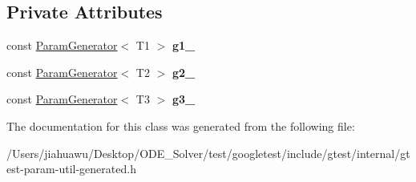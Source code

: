 \subsection*{Private Attributes}
\begin{DoxyCompactItemize}
\item 
\mbox{\label{classtesting_1_1internal_1_1_cartesian_product_generator3_a2c42604631f735285a8ed339e0b1373e}} 
const \mbox{\hyperlink{classtesting_1_1internal_1_1_param_generator}{Param\+Generator}}$<$ T1 $>$ {\bfseries g1\+\_\+}
\item 
\mbox{\label{classtesting_1_1internal_1_1_cartesian_product_generator3_a904aef44febd3230ab9f9f36d0c0b876}} 
const \mbox{\hyperlink{classtesting_1_1internal_1_1_param_generator}{Param\+Generator}}$<$ T2 $>$ {\bfseries g2\+\_\+}
\item 
\mbox{\label{classtesting_1_1internal_1_1_cartesian_product_generator3_ab10481ef2569cea953bdb3b4cac2a5c2}} 
const \mbox{\hyperlink{classtesting_1_1internal_1_1_param_generator}{Param\+Generator}}$<$ T3 $>$ {\bfseries g3\+\_\+}
\end{DoxyCompactItemize}


The documentation for this class was generated from the following file\+:\begin{DoxyCompactItemize}
\item 
/\+Users/jiahuawu/\+Desktop/\+O\+D\+E\+\_\+\+Solver/test/googletest/include/gtest/internal/gtest-\/param-\/util-\/generated.\+h\end{DoxyCompactItemize}

